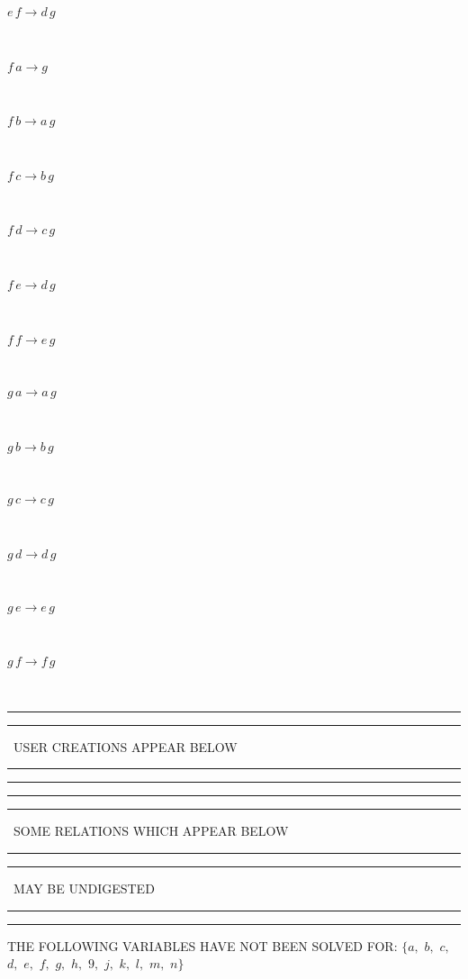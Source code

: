 \begin{minipage}{6in}
$
e\,
 f\rightarrow d\,
 g
$
\end{minipage}\medskip \\
\begin{minipage}{6in}
$
f\,
 a\rightarrow g
$
\end{minipage}\medskip \\
\begin{minipage}{6in}
$
f\,
 b\rightarrow a\,
 g
$
\end{minipage}\medskip \\
\begin{minipage}{6in}
$
f\,
 c\rightarrow b\,
 g
$
\end{minipage}\medskip \\
\begin{minipage}{6in}
$
f\,
 d\rightarrow c\,
 g
$
\end{minipage}\medskip \\
\begin{minipage}{6in}
$
f\,
 e\rightarrow d\,
 g
$
\end{minipage}\medskip \\
\begin{minipage}{6in}
$
f\,
 f\rightarrow e\,
 g
$
\end{minipage}\medskip \\
\begin{minipage}{6in}
$
g\,
 a\rightarrow a\,
 g
$
\end{minipage}\medskip \\
\begin{minipage}{6in}
$
g\,
 b\rightarrow b\,
 g
$
\end{minipage}\medskip \\
\begin{minipage}{6in}
$
g\,
 c\rightarrow c\,
 g
$
\end{minipage}\medskip \\
\begin{minipage}{6in}
$
g\,
 d\rightarrow d\,
 g
$
\end{minipage}\medskip \\
\begin{minipage}{6in}
$
g\,
 e\rightarrow e\,
 g
$
\end{minipage}\medskip \\
\begin{minipage}{6in}
$
g\,
 f\rightarrow f\,
 g
$
\end{minipage}\\
\rule[2pt]{6in}{1pt}\hfil\break
\rule[2.5pt]{1.701in}{1pt}
\ USER CREATIONS APPEAR BELOW\ 
\rule[2.5pt]{1.701in}{1pt}\hfil\break
\rule[2pt]{6in}{1pt}\hfil\break
\rule[2pt]{6in}{4pt}\hfil\break
\rule[2pt]{1.45in}{4pt}
\ SOME RELATIONS WHICH APPEAR BELOW\ 
\rule[2pt]{1.45in}{4pt}\hfil\break
\rule[2pt]{2.18in}{4pt}
\ MAY BE UNDIGESTED\ 
\rule[2pt]{2.18in}{4pt}\hfil\break
\rule[2pt]{6in}{4pt}\hfil\break
THE FOLLOWING VARIABLES HAVE NOT BEEN SOLVED FOR:\hfil\break
$\{a,
$ $
b,
$ $
c,
$ $
d,
$ $
e,
$ $
f,
$ $
g,
$ $
h,
$ $
9,
$ $
j,
$ $
k,
$ $
l,
$ $
m,
$ $
n\}$
\smallskip\\
\vspace{10pt}

